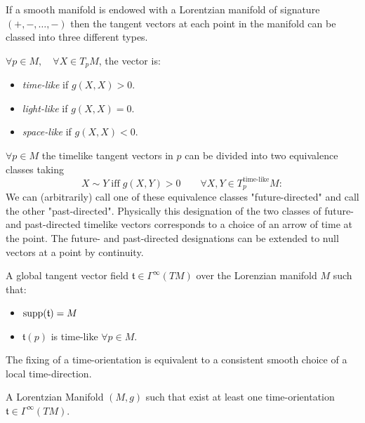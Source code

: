 \documentclass[a4paper,12pt]{scrartcl}    %
\begin{document}
	\begin{observation}
		If a smooth manifold is endowed with a Lorentzian manifold of signature $(+, -, \ldots, -)$ then the tangent vectors at each point in the manifold can be classed into three different types. 
		\begin{notationfix}
			$\forall p \in M, \quad \forall X \in T_pM$, the vector is:
			\begin{itemize}
				\item \emph{time-like} if $g(X,X)>0$.
				\item \emph{light-like} if $g(X,X)=0$.
				\item \emph{space-like} if $g(X,X)<0$.
			\end{itemize}
		\end{notationfix}
	\end{observation}

	\begin{observation}
		$\forall p\in M$ the timelike tangent vectors in $p$ can be divided into two equivalence classes taking
		\begin{displaymath}
			X \sim Y \; \textrm{iff} \; g(X,Y)>0 \qquad \forall X,Y \in T^\textrm{time-like}_pM:
		\end{displaymath}
		We can (arbitrarily) call one of these equivalence classes "future-directed" and call the other "past-directed". Physically this designation of the two classes of future- and past-directed timelike vectors corresponds to a choice of an arrow of time at the point. The future- and past-directed designations can be extended to null vectors at a point by continuity.
	\end{observation}
	
	\begin{definition}
		A global tangent vector field  $\mathfrak{t}\in \Gamma^\infty(TM)$ over the Lorenzian manifold $M$ such that:
		\begin{itemize}
			\item $\textrm{supp}(\mathfrak{t}) = M$
			\item $\mathfrak{t}(p)$ is time-like $\forall p \in M$.
		\end{itemize}
	\end{definition}
	\begin{observation}
		The fixing of a time-orientation is equivalent to a consistent smooth choice of a local time-direction.
	\end{observation}	
	
	\begin{definition}
		A Lorentzian Manifold $(M,g)$ such that exist at least one time-orientation $\mathfrak{t}\in \Gamma^\infty(TM)$.
	\end{definition}
\end{document}
